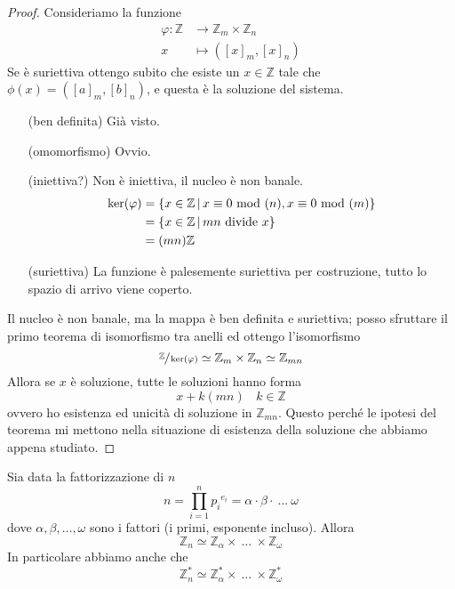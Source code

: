 \begin{proof}
	Consideriamo la funzione 
	\begin{align*}
	\varphi:\mathbb{Z}&\longrightarrow\mathbb{Z}_m\times\mathbb{Z}_n\\
	x&\longmapsto\left([x]_m,[x]_n\right)
	\end{align*}
	Se è suriettiva ottengo subito che esiste un $x\in\mathbb{Z}$ tale che $\phi(x)=\left([a]_m,[b]_n\right)$, e questa è la soluzione del sistema.
	\begin{itemize}
		\item[(ben definita)] Già visto.
		\item[(omomorfismo)] Ovvio.
		\item[(iniettiva?)] Non è iniettiva, il nucleo è non banale.
		\begin{align*}
		\ker(\varphi)&=\left\{x\in\mathbb{Z} \, \middle| \, x\equiv 0 \ \mathrm{mod}\ (n),x \equiv 0 \ \mathrm{mod}\ (m)\right\}\\
		&=\left\{x\in\mathbb{Z} \, \middle| \, \text{$mn$ divide $x$}\right\}\\
		&=(mn)\mathbb{Z}
		\end{align*}
		\item[(suriettiva)]
		La funzione è palesemente suriettiva per costruzione, tutto lo spazio di arrivo viene coperto.
	\end{itemize}
	Il nucleo è non banale, ma la mappa è ben definita e suriettiva; posso sfruttare il primo teorema di isomorfismo tra anelli ed ottengo l'isomorfismo
	\begin{equation*}
	\sfrac{\mathbb{Z}}{\ker(\varphi)}\simeq\mathbb{Z}_m\times\mathbb{Z}_n\simeq\mathbb{Z}_{mn}
	\end{equation*}
	Allora se $x$ è soluzione, tutte le soluzioni hanno forma 
	\begin{equation*}
	x+k(mn) \ \ \ \ k\in\mathbb{Z}
	\end{equation*}
	ovvero ho esistenza ed unicità di soluzione in $\mathbb{Z}_{mn}$. Questo perché le ipotesi del teorema mi mettono nella situazione di esistenza della soluzione che abbiamo appena studiato.
\end{proof}
\begin{proposizione}
	Sia data la fattorizzazione di $n$
	\begin{equation*}
	n=\prod_{i=1}^{n}{p_i}^{{e_i}}=\alpha\cdot\beta\cdot\ \dots \ \omega
	\end{equation*}
	dove $\alpha,\beta,\dots,\omega$ sono i fattori (i primi, esponente incluso). Allora 
	\begin{equation*}
	\mathbb{Z}_n\simeq\mathbb{Z}_{\alpha}\times\ \dots \ \times\mathbb{Z}_{\omega}
	\end{equation*}
	In particolare abbiamo anche che 
	\begin{equation*}
	\mathbb{Z}_n^*\simeq\mathbb{Z}_{\alpha}^*\times\ \dots \ \times\mathbb{Z}_{\omega}^*
	\end{equation*}
\end{proposizione}
